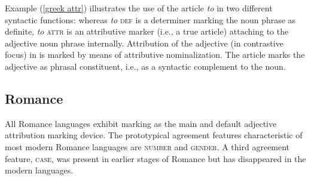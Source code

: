 Example (\ref{greek attr}) illustrates the use of the article \textit{to} in two different syntactic functions: whereas \textit{to} \textsc{def} is a determiner marking the noun phrase as definite, \textit{to} \textsc{attr} is an attributive marker (i.e., a true article) attaching to the adjective noun phrase internally. Attribution of the adjective (in contrastive focus) in  is marked by means of attributive nominalization. The article marks the adjective as phrasal constituent, i.e., as a syntactic complement to the noun.

\subsection{Romance}
All Romance languages exhibit  marking as the main and default adjective attribution marking device. The prototypical agreement features characteristic of most modern Romance languages are \textsc{number} and \textsc{gender}. A third agreement feature, \textsc{case}, was present in earlier stages of Romance but has disappeared in the modern languages.

